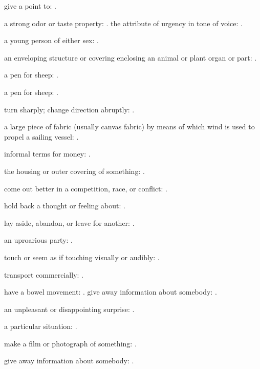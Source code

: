   give a point to: .

  a strong odor or taste property: . the attribute of urgency in tone of voice: .

  a young person of either sex: .

  an enveloping structure or covering enclosing an animal or plant organ or part: .

  a pen for sheep: .

  a pen for sheep: .

  turn sharply; change direction abruptly: .

  a large piece of fabric (usually canvas fabric) by means of which wind is used to propel a sailing vessel: .

  informal terms for money: .

  the housing or outer covering of something: .

  come out better in a competition, race, or conflict: .

  hold back a thought or feeling about: .

  lay aside, abandon, or leave for another: .

  an uproarious party: .

  touch or seem as if touching visually or audibly: .

  transport commercially: .

  have a bowel movement: . give away information about somebody: .

  an unpleasant or disappointing surprise: .

  a particular situation: .

  make a film or photograph of something: .

  give away information about somebody: .

